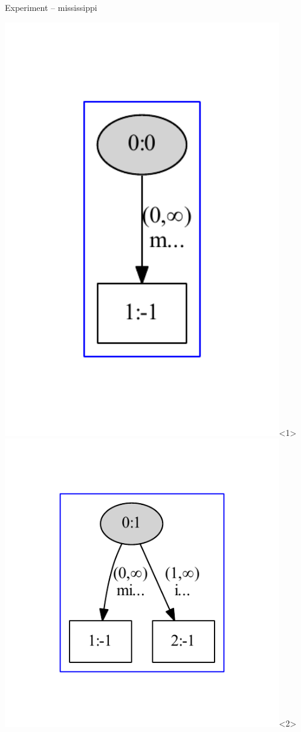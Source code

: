 \begin{frame}{Experiment -- mississippi}

\begin{overlayarea}{\textwidth}{\textheight}
\includegraphics[keepaspectratio,height=0.9\textheight,width=0.9\textwidth]{m.pdf}<1>
\includegraphics[keepaspectratio,height=0.9\textheight,width=0.9\textwidth]{mi.pdf}<2>

\end{overlayarea}
\end{frame}
